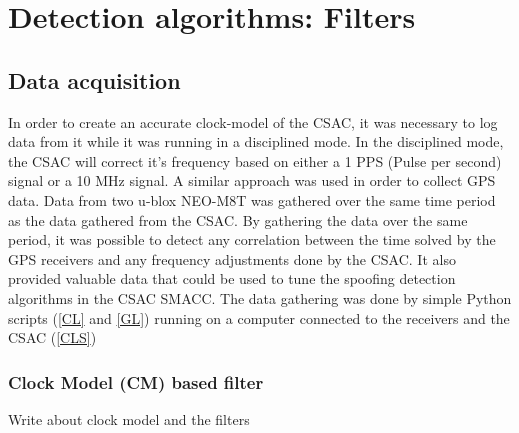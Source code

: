 \documentclass[12pt,english,a4paper]{report}
\begin{document}
\section{Detection algorithms: Filters}
\subsection{Data acquisition}\label{data_aquisition}
In order to create an accurate clock-model of the CSAC, it was necessary to log data from it while it was running in a disciplined mode. In the disciplined mode, the CSAC will correct it's frequency based on either a 1 PPS (Pulse per second) signal or a 10 MHz signal. A similar approach was used in order to collect GPS data. Data from two u-blox NEO-M8T was gathered over the same time period as the data gathered from the CSAC. By gathering the data over the same period, it was possible to detect any correlation between the time solved by the GPS receivers and any frequency adjustments done by the CSAC. It also provided valuable data that could be used to tune the spoofing detection algorithms in the CSAC SMACC. The data gathering was done by simple Python scripts (\ref{CL} and \ref{GL}) running on a computer connected to the receivers and the CSAC (\ref{CLS})

\subsubsection{Clock Model (CM) based filter}\label{cmbf}
Write about clock model and the filters
\end{document}
